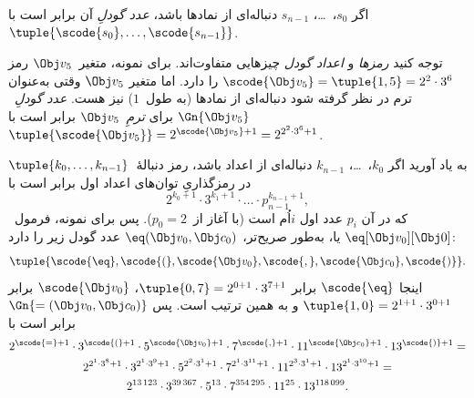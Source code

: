 \documentclass[../../../include/open-logic-section]{subfiles}
\begin{document}
\begin{defn}
اگر $s_0$،~\dots، $s_{n-1}$ دنباله‌ای از نمادها باشد، \emph{عدد
گودلِ} آن برابر است با
$\tuple{\scode{s_0},\dots,\scode{s_{n-1}}}$.
\end{defn}

\begin{explain}
توجه کنید \emph{رمزها} و \emph{اعداد گودل} چیزهایی متفاوت‌اند. برای
نمونه، متغیر~$\Obj v_5$ رمز
$\scode{\Obj v_5}=\tuple{1,5}=2^2\cdot3^6$ را دارد. اما متغیر
$\Obj v_5$ وقتی به‌عنوان ترم در نظر گرفته شود دنباله‌ای از نمادها
(به طول~$1$) نیز هست. \emph{عدد گودلِ}~$\Gn{\Obj v_5}$ برای
\emph{ترمِ}~$\Obj v_5$ برابر است با
$\tuple{\scode{\Obj v_5}}=2^{\scode{\Obj v_5}+1}
=2^{2^2\cdot3^6+1}$.
\end{explain}

\begin{ex}
به یاد آورید اگر $k_0$،~\dots، $k_{n-1}$ دنباله‌ای از اعداد باشد،
رمز دنبالهٔ~$\tuple{k_0,\dots,k_{n-1}}$ در رمزگذاریِ توان‌های اعداد
اول برابر است با
\[
2^{k_0+1}\cdot3^{k_1+1}\cdot \dots \cdot p_{n-1}^{k_{n-1}+1},
\]
که در آن $p_i$ عدد اول $i$اُم است (با آغاز از~$p_0=2$). پس برای
نمونه، فرمول~$\eq[\Obj v_0][\Obj 0]$ یا، به‌طور صریح‌تر،
${\eq}(\Obj v_0,\Obj c_0)$ عدد گودل زیر را دارد:
\[
\tuple{\scode{\eq},\scode{(},\scode{\Obj v_0},\scode{,}, \scode{\Obj
    c_0},\scode{)}}.
\]
اینجا $\scode{\eq}$ برابر
$\tuple{0,7}=2^{0+1}\cdot3^{7+1}$، $\scode{\Obj v_0}$ برابر
$\tuple{1,0}=2^{1+1}\cdot3^{0+1}$ و به همین ترتیب است. پس
$\Gn{=(\Obj v_0,\Obj c_0)}$ برابر است با
\begin{multline*}
2^{\scode{=} + 1}\cdot 3^{\scode{(}+1}\cdot 5^{\scode{\Obj v_0}+1}
\cdot 7^{\scode{,} + 1} \cdot 11^{\scode{\Obj c_0}+1} \cdot
13^{\scode{)}+1} = \\
2^{2^1\cdot 3^8 + 1}\cdot 3^{2^1\cdot 3^9+1}\cdot 5^{2^2\cdot 3^1+1}
\cdot 7^{2^1\cdot 3^{11} + 1} \cdot 11^{2^3\cdot3^1+1} \cdot
13^{2^1\cdot3^{10}+1} = \\
2^{13\,123}\cdot 3^{39\,367}\cdot 5^{13}\cdot 7^{354\,295}\cdot11^{25}\cdot13^{118\,099}.
\end{multline*}
\end{ex}
\end{document}
